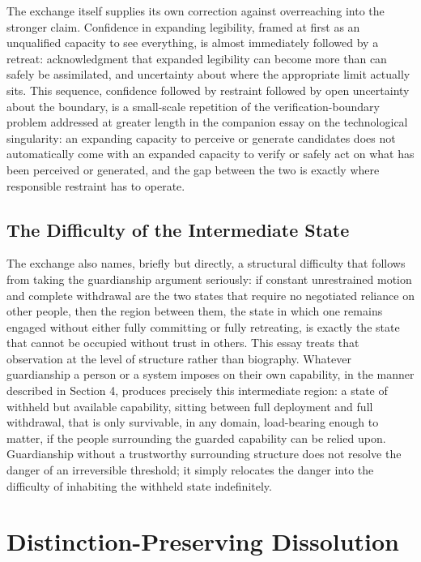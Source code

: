 \documentclass[11pt]{article}
\begin{document}
The exchange itself supplies its own correction against overreaching into the stronger claim. Confidence in expanding legibility, framed at first as an unqualified capacity to see everything, is almost immediately followed by a retreat: acknowledgment that expanded legibility can become more than can safely be assimilated, and uncertainty about where the appropriate limit actually sits. This sequence, confidence followed by restraint followed by open uncertainty about the boundary, is a small-scale repetition of the verification-boundary problem addressed at greater length in the companion essay on the technological singularity: an expanding capacity to perceive or generate candidates does not automatically come with an expanded capacity to verify or safely act on what has been perceived or generated, and the gap between the two is exactly where responsible restraint has to operate.

\subsection{The Difficulty of the Intermediate State}

The exchange also names, briefly but directly, a structural difficulty that follows from taking the guardianship argument seriously: if constant unrestrained motion and complete withdrawal are the two states that require no negotiated reliance on other people, then the region between them, the state in which one remains engaged without either fully committing or fully retreating, is exactly the state that cannot be occupied without trust in others. This essay treats that observation at the level of structure rather than biography. Whatever guardianship a person or a system imposes on their own capability, in the manner described in Section 4, produces precisely this intermediate region: a state of withheld but available capability, sitting between full deployment and full withdrawal, that is only survivable, in any domain, load-bearing enough to matter, if the people surrounding the guarded capability can be relied upon. Guardianship without a trustworthy surrounding structure does not resolve the danger of an irreversible threshold; it simply relocates the danger into the difficulty of inhabiting the withheld state indefinitely.

\section{Distinction-Preserving Dissolution}
\end{document}
